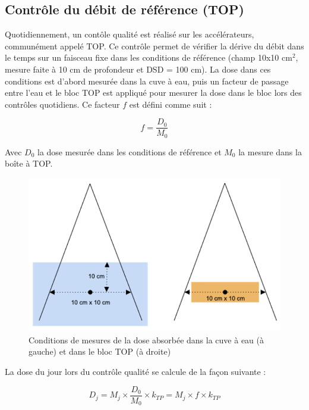 \documentclass{article}
\begin{document}
\subsection{Contrôle du débit de référence (TOP)}

Quotidiennement, un contôle qualité est réalisé sur les accélérateurs, communément appelé TOP. Ce contrôle permet de vérifier la dérive du débit dans le temps sur un faisceau fixe dans les conditions de référence (champ 10x10 cm$^2$, mesure faite à 10 cm de profondeur et DSD = 100 cm). La dose dans ces conditions est d'abord mesurée dans la cuve à eau, puis un facteur de passage entre l'eau et le bloc TOP est appliqué pour mesurer la dose dans le bloc lors des contrôles quotidiens. Ce facteur $f$ est défini comme suit :

\begin{equation}
  f = \dfrac{D_0}{M_0}
  \label{eq_facteur_top}
\end{equation}

Avec $D_0$ la dose mesurée dans les conditions de référence et $M_0$ la mesure dans la boîte à TOP.

\begin{figure}[h]
  \centering
  \includegraphics[scale=0.8]{figures/conditions_ref_top.png}
  \caption{Conditions de mesures de la dose absorbée dans la cuve à eau (à gauche) et dans le bloc TOP (à droite)}
  \label{fig_top}
\end{figure}

La dose du jour lors du contrôle qualité se calcule de la façon suivante :

\begin{equation}
  D_j = M_j \times \dfrac{D_0}{M_0} \times k_{TP} = M_j \times f \times k_{TP}
  \label{eq_top_jour}
\end{equation}
\end{document}
